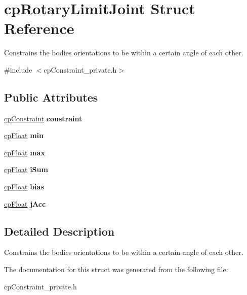 \hypertarget{structcp_rotary_limit_joint}{}\section{cp\+Rotary\+Limit\+Joint Struct Reference}
\label{structcp_rotary_limit_joint}


Constrains the bodies\textquotesingle{} orientations to be within a certain angle of each other.  




{\ttfamily \#include $<$cp\+Constraint\+\_\+private.\+h$>$}

\subsection*{Public Attributes}
\begin{DoxyCompactItemize}
\item 
\hypertarget{structcp_rotary_limit_joint_a447ab04f7ecace3c2cb7a9ad19e974ff}{}\hyperlink{structcp_constraint}{cp\+Constraint} {\bfseries constraint}\label{structcp_rotary_limit_joint_a447ab04f7ecace3c2cb7a9ad19e974ff}

\item 
\hypertarget{structcp_rotary_limit_joint_aa189b3e6886001824f2ae140d69c7322}{}\hyperlink{group__basic_types_gac1ed65573e035bf892505768c852d8d3}{cp\+Float} {\bfseries min}\label{structcp_rotary_limit_joint_aa189b3e6886001824f2ae140d69c7322}

\item 
\hypertarget{structcp_rotary_limit_joint_a0706d6b4bcefcf85838256418ed3283e}{}\hyperlink{group__basic_types_gac1ed65573e035bf892505768c852d8d3}{cp\+Float} {\bfseries max}\label{structcp_rotary_limit_joint_a0706d6b4bcefcf85838256418ed3283e}

\item 
\hypertarget{structcp_rotary_limit_joint_a5ec0c0943aa2f6afb90b114b8878bef5}{}\hyperlink{group__basic_types_gac1ed65573e035bf892505768c852d8d3}{cp\+Float} {\bfseries i\+Sum}\label{structcp_rotary_limit_joint_a5ec0c0943aa2f6afb90b114b8878bef5}

\item 
\hypertarget{structcp_rotary_limit_joint_a33bcd5092edad3f9e2d251c17fc18679}{}\hyperlink{group__basic_types_gac1ed65573e035bf892505768c852d8d3}{cp\+Float} {\bfseries bias}\label{structcp_rotary_limit_joint_a33bcd5092edad3f9e2d251c17fc18679}

\item 
\hypertarget{structcp_rotary_limit_joint_acd814943fe9a4065927ce4071d70adfd}{}\hyperlink{group__basic_types_gac1ed65573e035bf892505768c852d8d3}{cp\+Float} {\bfseries j\+Acc}\label{structcp_rotary_limit_joint_acd814943fe9a4065927ce4071d70adfd}

\end{DoxyCompactItemize}


\subsection{Detailed Description}
Constrains the bodies\textquotesingle{} orientations to be within a certain angle of each other. 

The documentation for this struct was generated from the following file\+:\begin{DoxyCompactItemize}
\item 
cp\+Constraint\+\_\+private.\+h\end{DoxyCompactItemize}
